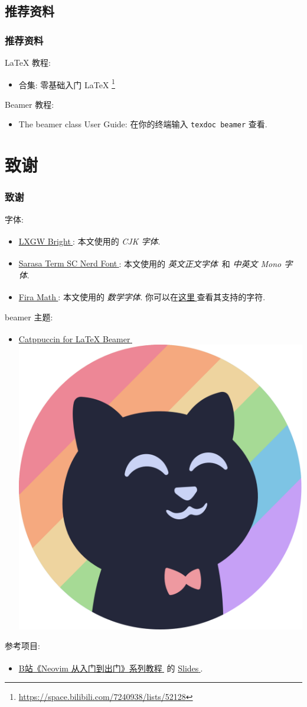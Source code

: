\documentclass[
aspectratio=169,%
]{beamer}
\newcommand{\mdlink}[2]{\href{#2}{#1\textsuperscript{}}}%
\newcommand{\fnlink}[2]{{#1} \footnote{\url{#2}}} %
\begin{document}
\subsection{推荐资料}

\begin{frame}\frametitle{推荐资料}
LaTeX 教程:
    \begin{itemize}
        \item \fnlink{合集: 零基础入门 LaTeX}{https://space.bilibili.com/7240938/lists/52128}
    \end{itemize}
Beamer 教程:
    \begin{itemize}
        \item The beamer class User Guide: 在你的终端输入 \texttt{texdoc beamer} 查看.
    \end{itemize}
\end{frame}
\section{致谢}

\begin{frame}\frametitle{致谢}
字体:
\begin{itemize}
        \item \mdlink{LXGW Bright}{https://github.com/lxgw/LxgwBright}: 本文使用的 \textit{CJK 字体}.
        \item \mdlink{Sarasa Term SC Nerd Font}{https://github.com/laishulu/Sarasa-Term-SC-Nerd}: 本文使用的 \textit{英文正文字体}\  和 \textit{中英文 Mono 字体}.
        \item \mdlink{Fira Math}{https://github.com/firamath/firamath}: 本文使用的 \textit{数学字体}. 你可以在\mdlink{这里}{https://firamath.github.io/specimen.html}查看其支持的字符.
    \end{itemize}

beamer 主题:
\begin{itemize}
        \item \mdlink{Catppuccin for LaTeX Beamer}{https://github.com/atticus-sullivan/beamercolortheme} \includegraphics[height= 1.5 em,keepaspectratio]{./assets/figures/1544x1544_circle.png}
\end{itemize}

参考项目:
\begin{itemize}
        \item \mdlink{B\-站《Neovim 从入门到出门》系列教程}{https://space.bilibili.com/23686471/lists/5304627} 的 \mdlink{Slides}{https://github.com/Jacky-Lzx/nvim.tutorial.slides}.
\end{itemize}
\end{frame}
\end{document}
